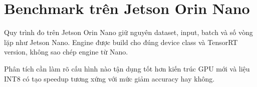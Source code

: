 \section{Benchmark trên Jetson Orin Nano}

Quy trình đo trên Jetson Orin Nano giữ nguyên dataset, input, batch và số vòng
lặp như Jetson Nano. Engine được build cho đúng device class và TensorRT version,
không sao chép engine từ Nano.

\begin{landscape}
\begin{table}[H]
\centering
\caption{YOLO inference trên Jetson Orin Nano}
\label{tab:orin-inference}
\end{table}
\end{landscape}

Phân tích cần làm rõ cấu hình nào tận dụng tốt hơn kiến trúc GPU mới và liệu INT8
có tạo speedup tương xứng với mức giảm accuracy hay không.